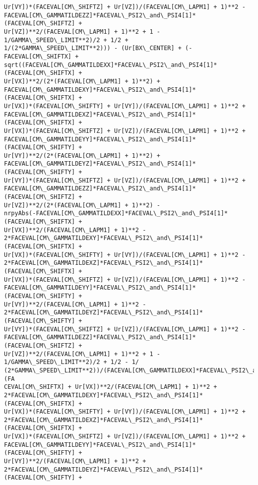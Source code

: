 \documentclass[landscape,letterpaper,10pt,english]{article}
\begin{document}
\begin{Verbatim}[commandchars=\\\{\}]
Ur[VY])*(FACEVAL[CM\_SHIFTZ] + Ur[VZ])/(FACEVAL[CM\_LAPM1] + 1)**2 -
FACEVAL[CM\_GAMMATILDEZZ]*FACEVAL\_PSI2\_and\_PSI4[1]*(FACEVAL[CM\_SHIFTZ] +
Ur[VZ])**2/(FACEVAL[CM\_LAPM1] + 1)**2 + 1 - 1/GAMMA\_SPEED\_LIMIT**2)/2 + 1/2 +
1/(2*GAMMA\_SPEED\_LIMIT**2))) - (Ur[BX\_CENTER] + (-FACEVAL[CM\_SHIFTX] +
sqrt((FACEVAL[CM\_GAMMATILDEXX]*FACEVAL\_PSI2\_and\_PSI4[1]*(FACEVAL[CM\_SHIFTX] +
Ur[VX])**2/(2*(FACEVAL[CM\_LAPM1] + 1)**2) +
FACEVAL[CM\_GAMMATILDEXY]*FACEVAL\_PSI2\_and\_PSI4[1]*(FACEVAL[CM\_SHIFTX] +
Ur[VX])*(FACEVAL[CM\_SHIFTY] + Ur[VY])/(FACEVAL[CM\_LAPM1] + 1)**2 +
FACEVAL[CM\_GAMMATILDEXZ]*FACEVAL\_PSI2\_and\_PSI4[1]*(FACEVAL[CM\_SHIFTX] +
Ur[VX])*(FACEVAL[CM\_SHIFTZ] + Ur[VZ])/(FACEVAL[CM\_LAPM1] + 1)**2 +
FACEVAL[CM\_GAMMATILDEYY]*FACEVAL\_PSI2\_and\_PSI4[1]*(FACEVAL[CM\_SHIFTY] +
Ur[VY])**2/(2*(FACEVAL[CM\_LAPM1] + 1)**2) +
FACEVAL[CM\_GAMMATILDEYZ]*FACEVAL\_PSI2\_and\_PSI4[1]*(FACEVAL[CM\_SHIFTY] +
Ur[VY])*(FACEVAL[CM\_SHIFTZ] + Ur[VZ])/(FACEVAL[CM\_LAPM1] + 1)**2 +
FACEVAL[CM\_GAMMATILDEZZ]*FACEVAL\_PSI2\_and\_PSI4[1]*(FACEVAL[CM\_SHIFTZ] +
Ur[VZ])**2/(2*(FACEVAL[CM\_LAPM1] + 1)**2) -
nrpyAbs(-FACEVAL[CM\_GAMMATILDEXX]*FACEVAL\_PSI2\_and\_PSI4[1]*(FACEVAL[CM\_SHIFTX] +
Ur[VX])**2/(FACEVAL[CM\_LAPM1] + 1)**2 -
2*FACEVAL[CM\_GAMMATILDEXY]*FACEVAL\_PSI2\_and\_PSI4[1]*(FACEVAL[CM\_SHIFTX] +
Ur[VX])*(FACEVAL[CM\_SHIFTY] + Ur[VY])/(FACEVAL[CM\_LAPM1] + 1)**2 -
2*FACEVAL[CM\_GAMMATILDEXZ]*FACEVAL\_PSI2\_and\_PSI4[1]*(FACEVAL[CM\_SHIFTX] +
Ur[VX])*(FACEVAL[CM\_SHIFTZ] + Ur[VZ])/(FACEVAL[CM\_LAPM1] + 1)**2 -
FACEVAL[CM\_GAMMATILDEYY]*FACEVAL\_PSI2\_and\_PSI4[1]*(FACEVAL[CM\_SHIFTY] +
Ur[VY])**2/(FACEVAL[CM\_LAPM1] + 1)**2 -
2*FACEVAL[CM\_GAMMATILDEYZ]*FACEVAL\_PSI2\_and\_PSI4[1]*(FACEVAL[CM\_SHIFTY] +
Ur[VY])*(FACEVAL[CM\_SHIFTZ] + Ur[VZ])/(FACEVAL[CM\_LAPM1] + 1)**2 -
FACEVAL[CM\_GAMMATILDEZZ]*FACEVAL\_PSI2\_and\_PSI4[1]*(FACEVAL[CM\_SHIFTZ] +
Ur[VZ])**2/(FACEVAL[CM\_LAPM1] + 1)**2 + 1 - 1/GAMMA\_SPEED\_LIMIT**2)/2 + 1/2 - 1/
(2*GAMMA\_SPEED\_LIMIT**2))/(FACEVAL[CM\_GAMMATILDEXX]*FACEVAL\_PSI2\_and\_PSI4[1]*(FA
CEVAL[CM\_SHIFTX] + Ur[VX])**2/(FACEVAL[CM\_LAPM1] + 1)**2 +
2*FACEVAL[CM\_GAMMATILDEXY]*FACEVAL\_PSI2\_and\_PSI4[1]*(FACEVAL[CM\_SHIFTX] +
Ur[VX])*(FACEVAL[CM\_SHIFTY] + Ur[VY])/(FACEVAL[CM\_LAPM1] + 1)**2 +
2*FACEVAL[CM\_GAMMATILDEXZ]*FACEVAL\_PSI2\_and\_PSI4[1]*(FACEVAL[CM\_SHIFTX] +
Ur[VX])*(FACEVAL[CM\_SHIFTZ] + Ur[VZ])/(FACEVAL[CM\_LAPM1] + 1)**2 +
FACEVAL[CM\_GAMMATILDEYY]*FACEVAL\_PSI2\_and\_PSI4[1]*(FACEVAL[CM\_SHIFTY] +
Ur[VY])**2/(FACEVAL[CM\_LAPM1] + 1)**2 +
2*FACEVAL[CM\_GAMMATILDEYZ]*FACEVAL\_PSI2\_and\_PSI4[1]*(FACEVAL[CM\_SHIFTY] +

\end{Verbatim}
\end{document}
